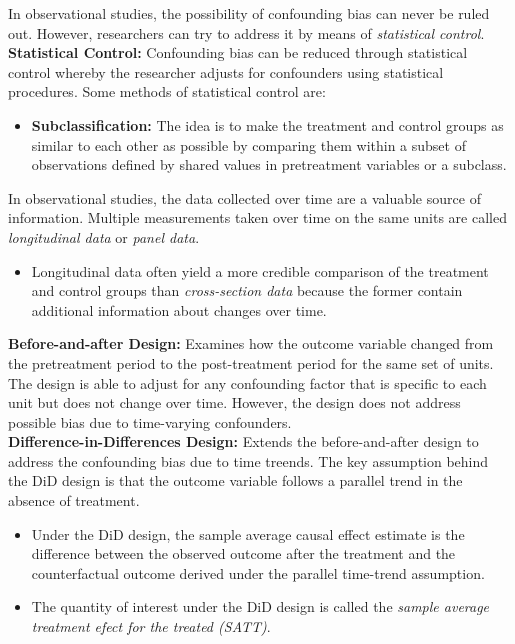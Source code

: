 \documentclass{article}
\begin{document}
    \noindent In observational studies, the possibility of confounding bias
can never be ruled out. However, researchers can try to address it by means
of \textit{statistical control}.\\

    \noindent \textbf{Statistical Control:} Confounding bias can be reduced
through statistical control whereby the researcher adjusts for confounders
using statistical procedures. Some methods of statistical control are:
    \begin{itemize}
        \item \textbf{Subclassification:} The idea is to make the treatment
        and control groups as similar to each other as possible by comparing
        them within a subset of observations defined by shared values in
        pretreatment variables or a subclass.
    \end{itemize}

    \noindent In observational studies, the data collected over time are a
valuable source of information. Multiple measurements taken over time on the
same units are called \textit{longitudinal data} or \textit{panel data}.
    \begin{itemize}
        \item Longitudinal data often yield a more credible comparison of
        the treatment and control groups than \textit{cross-section data}
        because the former contain additional information about changes over
        time.
    \end{itemize}

    \noindent \textbf{Before-and-after Design:} Examines how the outcome
variable changed from the pretreatment period to the post-treatment period
for the same set of units. The design is able to adjust for any confounding
factor that is specific to each unit but does not change over time. However,
the design does not address possible bias due to time-varying confounders.\\

    \noindent \textbf{Difference-in-Differences Design:} Extends the
before-and-after design to address the confounding bias due to time treends.
The key assumption behind the DiD design is that the outcome variable
follows a parallel trend in the absence of treatment.
    \begin{itemize}
        \item Under the DiD design, the sample average causal effect
        estimate is the difference between the observed outcome after the
        treatment and the counterfactual outcome derived under the parallel
        time-trend assumption.
        \item The quantity of interest under the DiD design is called the \textit{sample average treatment efect for the treated (SATT)}.
    \end{itemize}
\end{document}
